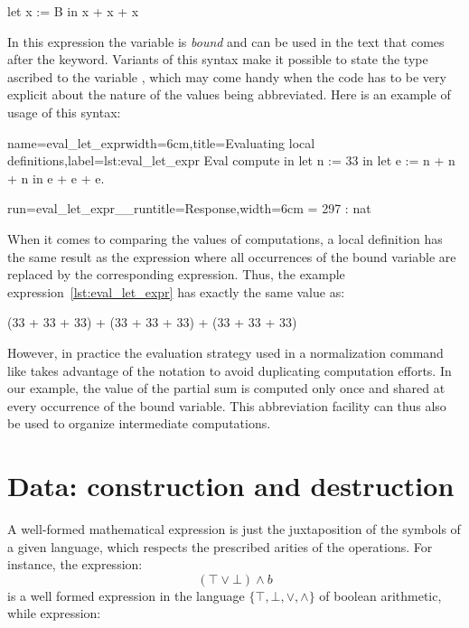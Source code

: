\begin{coq}{}{}
let x := B in
   x + x + x
\end{coq}

In this expression the variable  is {\em bound} and can be used in
the text that comes after the  keyword.
Variants of this syntax make it possible to state the
type ascribed to the variable , which may come handy when the
code has to be very explicit about the nature of the values being
abbreviated.
Here is an example of usage of this syntax:

\begin{coq}{name=eval_let_expr}{width=6cm,title=Evaluating local definitions,label=lst:eval_let_expr}
Eval compute in
  let n := 33 in
  let e := n + n + n in
    e + e + e.
\end{coq}
\begin{coqout}{run=eval_let_expr__run}{title=Response,width=6cm}
 = 297 : nat
\end{coqout}

When it comes to comparing the values of computations, a local definition
has the same result as the expression where all occurrences of the bound
variable are replaced by the corresponding expression.  Thus, the example
expression~\ref{lst:eval_let_expr} has exactly the same value as:

\begin{coq}{}{}
(33 + 33 + 33) + (33 + 33 + 33) + (33 + 33 + 33)
\end{coq}

However, in practice the evaluation strategy used in a normalization
command like  takes advantage of the
  notation to
avoid duplicating computation efforts. In our example, the value of
the partial sum  is computed only once and shared at
every occurrence of the bound variable. This abbreviation facility can
thus also be used to organize intermediate computations.

\section{Data: construction and destruction}

A well-formed mathematical expression is just the juxtaposition of the
symbols of a given language, which respects the prescribed arities of
the operations. For instance, the expression:
\[(\top \vee \bot) \wedge b\]
is a well formed expression in the language $\{\top, \bot,\vee,\wedge\}$ of
boolean arithmetic, while expression:

